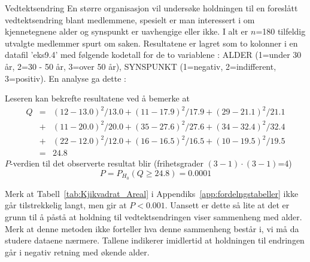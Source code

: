 \begin{eksempel}{Vedtektsendring}
En større organisasjon vil undersøke holdningen til en foreslått
vedtektsendring blant medlemmene, spesielt er man interessert i om 
kjennetegnene alder og synspunkt er uavhengige eller ikke.  I alt er 
$n$=180 tilfeldig u\-tvalgte medlemmer spurt om saken.  Resultatene er
lagret som to kolonner i en datafil 'eks9.4' med følgende kodetall for de
to variablene : ALDER (1=under 30 år, 2=30 - 50 år, 3=over 50 år), 
SYNSPUNKT (1=negativ, 2=indifferent, 3=positiv). En analyse ga dette : 

\begin{center}  \end{center}
Leseren kan bekrefte resultatene ved å bemerke at
\begin{eqnarray*}
 Q&=&{(12-13.0)}^2/13.0+{(11-17.9)}^2/17.9+{(29-21.1)}^2/21.1 \\
  &+&{(11-20.0)}^2/20.0+{(35-27.6)}^2/27.6+{(34-32.4)}^2/32.4 \\
  &+&{(22-12.0)}^2/12.0+{(16-16.5)}^2/16.5+{(10-19.5)}^2/19.5 \\
  &=&24.8
\end{eqnarray*}
 $P$-verdien til det observerte resultat blir (frihetsgrader 
$(3-1)\cdot (3-1)$=4)
\[       P= P_{H_0}(Q\geq 24.8)=0.0001                  \]

Merk at Tabell~\ref{tab:Kjikvadrat_Areal} i Appendiks~\ref{app:fordelngstabeller} ikke går tilstrekkelig langt, men gir at
$P < 0.001$. Uansett er dette så lite at det er grunn
til å påstå at holdning til vedtektsendringen viser
sammenheng med alder.  Merk at denne metoden ikke forteller hva denne
sammenheng består i, vi må da studere dataene nærmere.
Tallene  indikerer imidlertid at holdningen til endringen
går i negativ retning med økende alder.
\end{eksempel}


